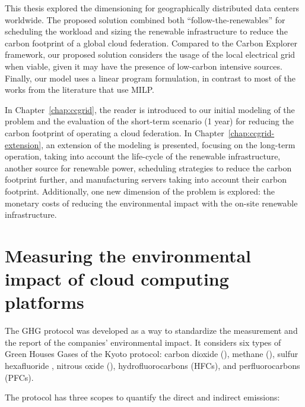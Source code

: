 This thesis explored the dimensioning for geographically distributed data centers worldwide. The proposed solution combined both ``follow-the-renewables'' for scheduling the workload and sizing the renewable infrastructure to reduce the carbon footprint of a global cloud federation. Compared to the Carbon Explorer framework, our proposed solution considers the usage of the local electrical grid when viable, given it may have the presence of low-carbon intensive sources. Finally, our model uses a linear program formulation, in contrast to most of the works from the literature that use MILP.

In Chapter~\ref{chap:ccgrid}, the reader is introduced to our initial modeling of the problem and the evaluation of the short-term scenario (1 year) for reducing the carbon footprint of operating a cloud federation. In Chapter~\ref{chap:ccgrid-extension}, an extension of the modeling is presented, focusing on the long-term operation, taking into account the life-cycle of the renewable infrastructure, another source for renewable power, scheduling strategies to reduce the carbon footprint further, and manufacturing servers taking into account their carbon footprint. Additionally,  one new dimension of the problem is explored: the monetary costs of reducing the environmental impact with the on-site renewable infrastructure.

\section{Measuring the environmental impact of cloud computing platforms}

\label{sec:measuring_environmental_impact}


The GHG protocol \cite{ghgprotocol2004} was developed as a way to standardize the measurement and the report of the companies' environmental impact. It considers six types of Green Houses Gases of the Kyoto protocol: carbon dioxide (), methane (), sulfur hexafluoride , nitrous oxide (), hydrofluorocarbons (HFCs), and perfluorocarbons (PFCs).


The protocol has three scopes to quantify the direct and indirect emissions:


